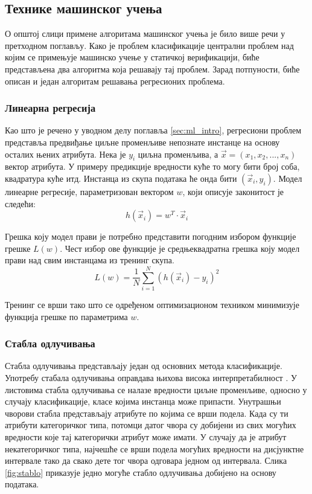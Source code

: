 \documentclass[a4paper]{article}
\begin{document}
{\subsection{Технике машинског учења}
О општој слици примене алгоритама машинског учења је било више речи у претходном поглављу. Како је проблем класификације централни проблем над којим се примењује машинско учење у статичкој верификацији, биће представљена два алгоритма која решавају тај проблем. Зарад потпуности, биће описан и један алгоритам решавања регресионих проблема.


\subsubsection*{Линеарна регресија}
Као што је речено у уводном делу поглавља \ref{sec:ml_intro}, регресиони проблем представља предвиђање циљне променљиве непознате инстанце на основу осталих њених атрибута. Нека је $y_i$ циљна променљива, а $\vec{x} = (x_1, x_2, ..., x_n)$ вектор атрибута. У примеру предикције вредности куће то могу бити број соба, квадратура куће итд. Инстанца из скупа података ће онда бити $(\vec{x}_i, y_i)$. Модел линеарне регресије, параметризован вектором $w$, који описује законитост је следећи:
\begin{equation}
    h(\vec{x}_i) = w^T \cdot \vec{x}_i
\end{equation}


Грешка коју модел прави је потребно представити погодним избором функције грешке $L(w)$. Чест избор ове функције је средњеквадратна грешка коју модел прави над свим инстанцама из тренинг скупа.
\begin{equation}
L(w) = \frac{1}{N}\sum \limits_{i=1}^{N} (h(\vec{x}_i) - y_i)^2
\end{equation}

Тренинг се врши тако што се одређеном оптимизационом техником минимизује функција грешке по параметрима $w$.


\subsubsection*{Стабла одлучивања}
Стабла одлучивања представљају један од основних метода класификације. Употребу стабала одлучивања оправдава њихова висока интерпретабилност \cite{dct-survey}. У листовима стабла одлучивања се налазе вредности циљне променљиве, односно у случају класификације, класе којима инстанца може припасти. Унутрашњи чворови стабла представљају атрибуте по којима се врши подела. Када су ти атрибути категоричког типа, потомци датог чвора су добијени из свих могућих вредности које тај категорички атрибут може имати. У случају да је атрибут некатегоричког типа, најчешће се врши подела могућих вредности на дисјунктне интервале тако да свако дете тог чвора одговара једном од интервала. Слика \ref{fig:stablo} приказује једно могуће стабло одлучивања добијено на основу података.

}
\end{document}

